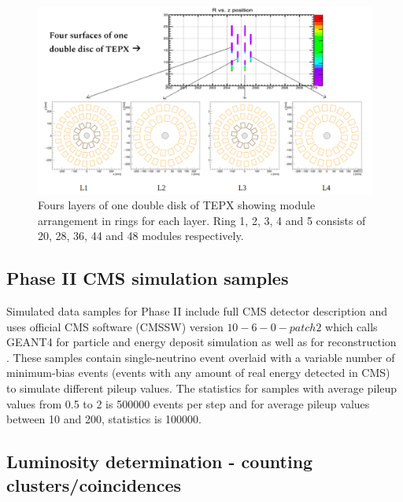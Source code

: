 \begin{figure}[H]
  \centering
  \includegraphics[width=1 \columnwidth]{./fourlayers.png}
  \caption{ \onehalfspacing Fours layers of one double disk of TEPX showing module arrangement in rings for each layer. Ring 1, 2, 3, 4 and 5 consists of 20, 28, 36, 44 and 48 modules respectively. }
  \label{fig:CMS}
\end{figure}

\subsection{Phase II CMS simulation samples}

\onelinespacing Simulated data samples for Phase II include full CMS detector description and uses official CMS software (CMSSW) version $10-6-0-patch2$ which calls GEANT4 for particle and energy deposit simulation as well as for reconstruction \cite{Agostinelli:2002hh}. These samples contain single-neutrino event overlaid with a variable number of minimum-bias events (events with any amount of real energy detected in CMS) to simulate different pileup values. The statistics for samples with average pileup values from 0.5 to 2 is 500000 events per step and for average pileup values between 10 and 200, statistics is 100000. \\

\subsection{Luminosity determination - counting clusters/coincidences}

